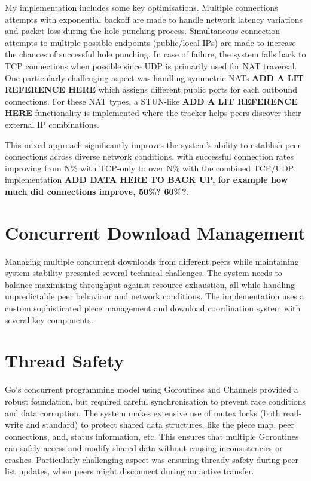 \documentclass[12pt,a4paper]{report}
\begin{document}
My implementation includes some key optimisations. Multiple connections attempts with exponential backoff are made to handle network latency variations and packet loss during the hole punching process. Simultaneous connection attempts to multiple possible endpoints (public/local IPs) are made to increase the chances of successful hole punching. In case of failure, the system falls back to TCP connections when possible since UDP is primarily used for NAT traversal. One particularly challenging aspect was handling symmetric NATs \textbf{ADD A LIT REFERENCE HERE} which assigns different public ports for each outbound connections. For these NAT types, a STUN-like \textbf{ADD A LIT REFERENCE HERE} functionality is implemented where the tracker helps peers discover their external IP combinations.

This mixed approach significantly improves the system's ability to establish peer connections across diverse network conditions, with successful connection rates improving from N\% with TCP-only to over N\% with the combined TCP/UDP implementation \textbf{ADD DATA HERE TO BACK UP, for example how much did connections improve, 50\%? 60\%?}.

\section{Concurrent Download Management}

Managing multiple concurrent downloads from different peers while maintaining system stability presented several technical challenges. The system needs to balance maximising throughput against resource exhaustion, all while handling unpredictable peer behaviour and network conditions. The implementation uses a custom sophisticated piece management and download coordination system with several key components.

\section*{Thread Safety}

Go's concurrent programming model using Goroutines and Channels provided a robust foundation, but required careful synchronisation to prevent race conditions and data corruption. The system makes extensive use of mutex locks (both read-write and standard) to protect shared data structures, like the piece map, peer connections, and, status information, etc. This ensures that multiple Goroutines can safely access and modify shared data without causing inconsistencies or crashes. Particularly challenging aspect was ensuring thready safety during peer list updates, when peers might disconnect during an active transfer.
\end{document}
